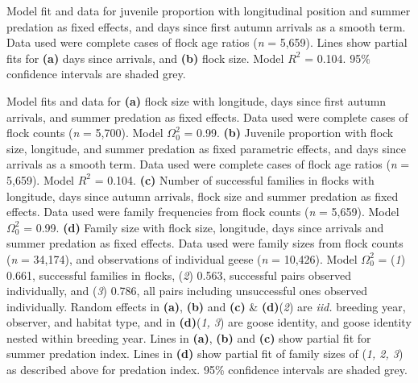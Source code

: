 Model fit and data for juvenile proportion with longitudinal position
and summer predation as fixed effects, and days since first autumn
arrivals as a smooth term. Data used were complete cases of flock age
ratios (\emph{n} = 5,659). Lines show partial fits for \textbf{(a)} days
since arrivals, and \textbf{(b)} flock size. Model \(R^2\) = 0.104. 95\%
confidence intervals are shaded grey.

Model fits and data for \textbf{(a)} flock size with longitude, days
since first autumn arrivals, and summer predation as fixed effects. Data
used were complete cases of flock counts (\emph{n} = 5,700). Model
\(\Omega^{2}_0\) = 0.99. \textbf{(b)} Juvenile proportion with flock
size, longitude, and summer predation as fixed parametric effects, and
days since arrivals as a smooth term. Data used were complete cases of
flock age ratios (\emph{n} = 5,659). Model \(R^2\) = 0.104. \textbf{(c)}
Number of successful families in flocks with longitude, days since
autumn arrivals, flock size and summer predation as fixed effects. Data
used were family frequencies from flock counts (\emph{n} = 5,659). Model
\(\Omega^{2}_0\) = 0.99. \textbf{(d)} Family size with flock size,
longitude, days since arrivals and summer predation as fixed effects.
Data used were family sizes from flock counts (\emph{n} = 34,174), and
observations of individual geese (\emph{n} = 10,426). Model
\(\Omega^{2}_0\) = (\emph{1}) 0.661, successful families in flocks,
(\emph{2}) 0.563, successful pairs observed individually, and (\emph{3})
0.786, all pairs including unsuccessful ones observed individually.
Random effects in \textbf{(a)}, \textbf{(b)} and \textbf{(c)} \&
\textbf{(d)}(\emph{2}) are \emph{iid.} breeding year, observer, and
habitat type, and in \textbf{(d)}(\emph{1, 3}) are goose identity, and
goose identity nested within breeding year. Lines in \textbf{(a)},
\textbf{(b)} and \textbf{(c)} show partial fit for summer predation
index. Lines in \textbf{(d)} show partial fit of family sizes of
(\emph{1, 2, 3}) as described above for predation index. 95\% confidence
intervals are shaded grey.
